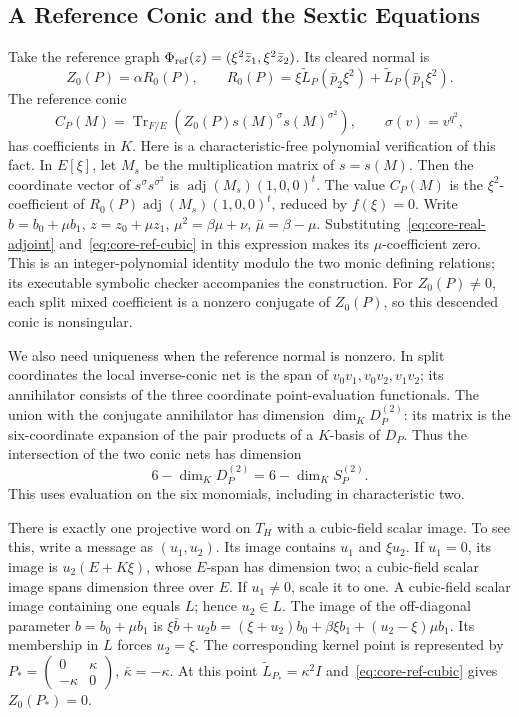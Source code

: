\documentclass[12pt,letterpaper,onecolumn]{article}
\theoremstyle{definition}
\theoremstyle{remark}
\DeclareMathOperator{\Tr}{Tr}
\begin{document}
\subsection{A Reference Conic and the Sextic Equations}
Take the reference graph
\(\Phi_{\rm ref}(z)=(\xi^2\bar z_1,\xi^2\bar z_2)\).
Its cleared normal is
\begin{equation}\label{eq:core-ref-cubic}
Z_0(P)=\alpha R_0(P),\qquad
R_0(P)=\xi\widetilde L_P(\bar p_2\xi^2)
                   +\widetilde L_P(\bar p_1\xi^2).
\end{equation}
The reference conic
\[
C_P(M)=\Tr_{F/E}(Z_0(P)s(M)^\sigma s(M)^{\sigma^2}),
\qquad \sigma(v)=v^{q^2},
\]
has coefficients in \(K\).
Here is a characteristic-free polynomial verification of this fact.
In \(E[\xi]\), let \(M_s\) be the multiplication matrix of \(s=s(M)\). Then the coordinate vector of \(s^\sigma s^{\sigma^2}\) is
\(\operatorname{adj}(M_s)(1,0,0)^t\).
The value \(C_P(M)\) is the \(\xi^2\)-coefficient of
\(R_0(P)\operatorname{adj}(M_s)(1,0,0)^t\), reduced by \(f(\xi)=0\).
Write \(b=b_0+\mu b_1\), \(z=z_0+\mu z_1\),
\(\mu^2=\beta\mu+\nu\), \(\bar\mu=\beta-\mu\).
Substituting~\eqref{eq:core-real-adjoint} and~\eqref{eq:core-ref-cubic} in this expression makes its \(\mu\)-coefficient zero.
This is an integer-polynomial identity modulo the two monic defining relations; its executable symbolic checker accompanies the construction.
For \(Z_0(P)\ne0\), each split mixed coefficient is a nonzero conjugate of \(Z_0(P)\), so this descended conic is nonsingular.

We also need uniqueness when the reference normal is nonzero.
In split coordinates the local inverse-conic net is the span of
\(v_0v_1,v_0v_2,v_1v_2\); its annihilator consists of the three coordinate point-evaluation functionals.
The union with the conjugate annihilator has dimension \(\dim_KD_P^{(2)}\): its matrix is the six-coordinate expansion of the pair products of a \(K\)-basis of \(D_P\).
Thus the intersection of the two conic nets has dimension
\[
6-\dim_KD_P^{(2)}=6-\dim_KS_P^{(2)}.
\]
This uses evaluation on the six monomials, including in characteristic two.

There is exactly one projective word on \(T_H\) with a cubic-field scalar image.
To see this, write a message as \((u_1,u_2)\). Its image contains \(u_1\) and \(\xi u_2\).
If \(u_1=0\), its image is \(u_2(E+K\xi)\), whose \(E\)-span has dimension two; a cubic-field scalar image spans dimension three over \(E\).
If \(u_1\ne0\), scale it to one. A cubic-field scalar image containing one equals \(L\); hence \(u_2\in L\).
The image of the off-diagonal parameter \(b=b_0+\mu b_1\) is
\(\xi\bar b+u_2b=(\xi+u_2)b_0+\beta\xi b_1+(u_2-\xi)\mu b_1\).
Its membership in \(L\) forces \(u_2=\xi\).
The corresponding kernel point is represented by
\(P_*=(\begin{smallmatrix}0&\kappa\\-\kappa&0\end{smallmatrix})\), \(\bar\kappa=-\kappa\).
At this point \(\widetilde L_{P_*}=\kappa^2I\) and~\eqref{eq:core-ref-cubic} gives \(Z_0(P_*)=0\).
\end{document}
